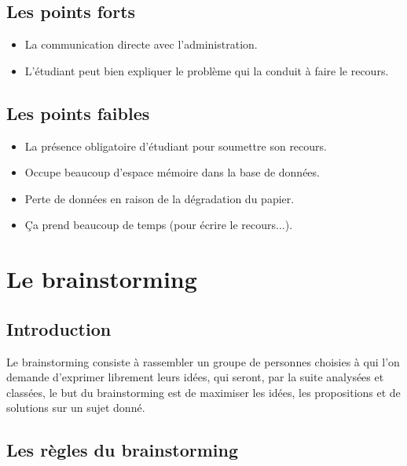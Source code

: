 \documentclass[12pt]{report}
\begin{document}
\subsection{Les points forts}
\begin{itemize}
    \item La communication directe avec l'administration.
    \item L'étudiant peut bien expliquer le problème qui la conduit à faire le recours. 
\end{itemize}

\subsection{Les points faibles}
\begin{itemize}
    \item La présence obligatoire d'étudiant pour soumettre son recours.
    \item Occupe beaucoup d'espace mémoire dans la base de données.
    \item Perte de données en raison de la dégradation du papier.
    \item Ça prend beaucoup de temps (pour écrire le recours...).
\end{itemize}

\section{Le brainstorming}

\subsection{Introduction}
Le brainstorming consiste à rassembler un groupe de personnes choisies à qui l’on demande d’exprimer librement leurs idées, qui seront, par la suite analysées et classées, le but du brainstorming est de maximiser les idées, les propositions et de solutions sur un sujet donné.

\subsection{Les règles du brainstorming}

\newpage
\end{document}
